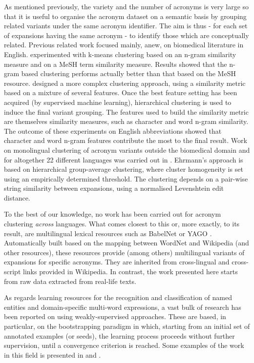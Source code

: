 \documentclass[output=paper]{langsci/langscibook}
\begin{document}
As mentioned previously, the variety and the number of acronyms is
very large so that it is useful to organise the acronym dataset on a
semantic basis by grouping related variants under the same acronym
identifier. The aim is thus - for each set of expansions having the
same acronym - to identify those which are conceptually
related. Previous related work focused mainly, anew, on biomedical
literature in English. \citet{adar-04} experimented with k-means
clustering based on an n-gram similarity measure and on a MeSH term
similarity measure. Results showed that the n-gram based clustering
performs actually better than that based on the MeSH resource.
\citet{okazaki-10} designed a more complex clustering approach, using
a similarity metric based on a mixture of several features. Once the
best feature setting has been acquired (by supervised machine
learning), hierarchical clustering is used to induce the final variant
grouping. The features used to build the similarity metric are
themselves similarity measures, such as character and word n-gram
similarity.  The outcome of these experiments on English abbreviations
showed that character and word n-gram features contribute the most to
the final result. Work on monolingual clustering of acronym variants
outside the biomedical domain and for altogether 22 different
languages was carried out in \citet{ehrmann-13}. Ehrmann's approach is
based on hierarchical group-average clustering, where cluster
homogeneity is set using an empirically determined threshold.  The
clustering depends on a pair-wise string similarity between
expansions, using a normalised Levenshtein edit distance.

To the best of our knowledge, no work has been carried out for acronym
clustering \textit{across} languages.  What comes closest to this or,
more exactly, to its result, are multilingual lexical resources such
as BabelNet \citep{navigli-12} or YAGO
\citep{hoffart-13}. Automatically built based on the mapping between
WordNet and Wikipedia (and other resources), these resources provide
(among others) multilingual variants of expansions for specific
acronyms.  They are inherited from cross-lingual and cross-script
links provided in Wikipedia.  In contrast, the work presented here
starts from raw data extracted from real-life texts.

As regards learning resources for the recognition and classification
of named entities and domain-specific multi-word expressions, a vast
bulk of research has been reported on using weakly-supervised
approaches. These are based, in particular, on the bootstrapping
paradigm in which, starting from an initial set of annotated examples
(or seeds), the learning process proceeds without further supervision,
until a convergence criterion is reached. Some examples of the work in
this field is presented in \citet{riloff:aaai-1996}
\citet{collins-singer:1999-emnlp} and \citet{yangarber:2002-coling}.
\end{document}

